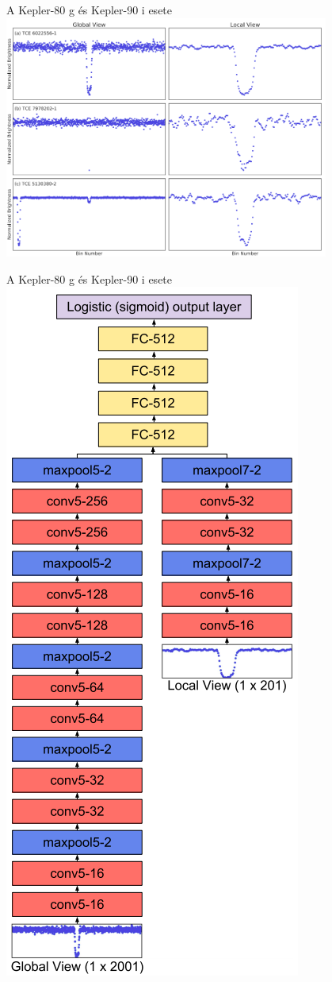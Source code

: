 \begin{frame}{A Kepler-80 g és Kepler-90 i esete}
    \centering
    \includegraphics[width=0.8\textwidth]{figures/kepler_tce_views.png}
\end{frame}

\begin{frame}{A Kepler-80 g és Kepler-90 i esete}
    \centering
    \includegraphics[height=0.85\textheight]{figures/kepler-80-cnn.png}
\end{frame}

